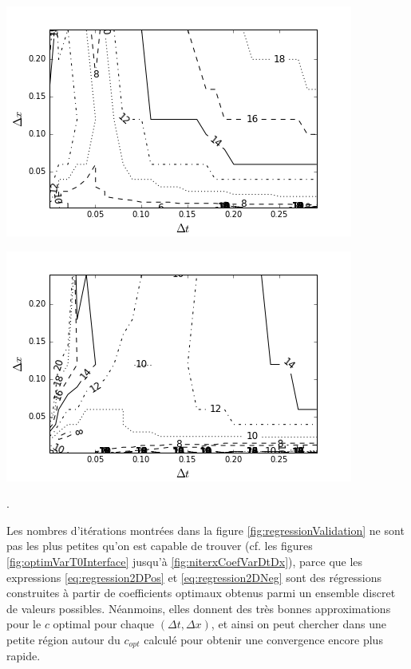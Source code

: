 \begingroup
\noindent
\begin{minipage}[t]{.45\linewidth}
	\includegraphics[scale=.45]{figures/FinalFigures/contourValidationN.png}
\end{minipage}
\hfill
\begin{minipage}[t]{.45\linewidth}
	\includegraphics[scale=.45]{figures/FinalFigures/contourValidationP.png}
\end{minipage}
.
\endgroup

\indent Les nombres d'itérations montrées dans la figure \ref{fig:regressionValidation} ne sont pas les plus petites qu'on est capable de trouver (cf. les figures \ref{fig:optimVarT0Interface} jusqu'à \ref{fig:niterxCoefVarDtDx}), parce que les expressions \eqref{eq:regression2DPos} et \eqref{eq:regression2DNeg} sont des régressions construites à partir de coefficients optimaux obtenus parmi un ensemble discret de valeurs possibles. Néanmoins, elles donnent des très bonnes approximations pour le $c$ optimal pour chaque $(\Delta t, \Delta x)$, et ainsi on peut chercher dans une petite région autour du $c_{opt}$ calculé pour obtenir une convergence encore plus rapide.

